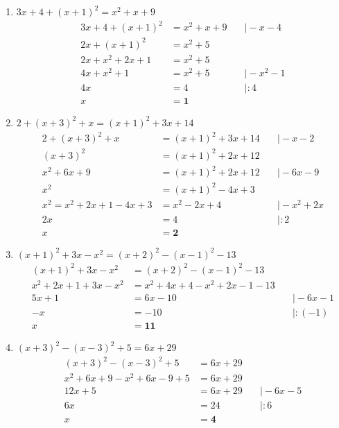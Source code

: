 \documentclass[a4paper,10pt]{article} %
\begin{document}
\begin{enumerate}[label=\alph*)]

  \item \(3x + 4 + {(x + 1)}^2 = x^2 + x + 9\)
  \[
    \begin{aligned}
      3x + 4 + {(x + 1)}^2 &= x^2 + x + 9 &\quad\big| - x - 4 \\
      2x + {(x + 1)}^2 &= x^2 + 5 \\
      2x + x^2 + 2x + 1 &= x^2 + 5 \\
      4x + x^2 + 1 &= x^2 + 5 &\quad\big| - x^2 - 1 \\
      4x &= 4 &\quad\big| : 4 \\
      x &= \mathbf{1}
    \end{aligned}
  \]

  \item \(2 + {(x + 3)}^2 + x = {(x + 1)}^2 + 3x + 14\)
  \[
    \begin{aligned}
      2 + {(x + 3)}^2 + x &= {(x + 1)}^2 + 3x + 14 &\quad\big| - x - 2 \\
      {(x + 3)}^2 &= {(x + 1)}^2 + 2x + 12 \\
      x^2 + 6x + 9 &= {(x + 1)}^2 + 2x + 12 &\quad\big| - 6x - 9 \\
      x^2 &= {(x + 1)}^2 - 4x + 3 \\
      x^2 = x^2 + 2x + 1 - 4x + 3 &=x^2 - 2x + 4 &\quad\big| - x^2 + 2x \\
      2x &= 4 &\quad\big| : 2 \\
      x &= \mathbf{2}
    \end{aligned}
  \]

  \item \({(x + 1)}^2 + 3x - x^2 = {(x + 2)}^2 - {(x - 1)}^2 - 13\)
  \[
    \begin{aligned}
      {(x + 1)}^2 + 3x - x^2 &= {(x + 2)}^2 - {(x - 1)}^2 - 13 \\
      x^2 + 2x + 1 + 3x - x^2 &= x^2 + 4x + 4 - x^2 + 2x - 1 - 13 \\
      5x + 1 &= 6x - 10 &\quad\big| - 6x - 1 \\
      -x &= -10 &\quad\big| : (-1) \\
      x &= \mathbf{11}
    \end{aligned}
  \]

  \item \({(x + 3)}^2 - {(x - 3)}^2 + 5 = 6x + 29\)
  \[
    \begin{aligned}
      {(x + 3)}^2 - {(x - 3)}^2 + 5 &= 6x + 29 \\
      x^2 + 6x + 9 - x^2 + 6x - 9 + 5 &= 6x + 29 \\
      12x + 5 &= 6x + 29 &\quad\big| - 6x - 5 \\
      6x &= 24 &\quad\big| : 6 \\
      x &= \mathbf{4}
    \end{aligned}
  \]


\end{enumerate}
\end{document}
